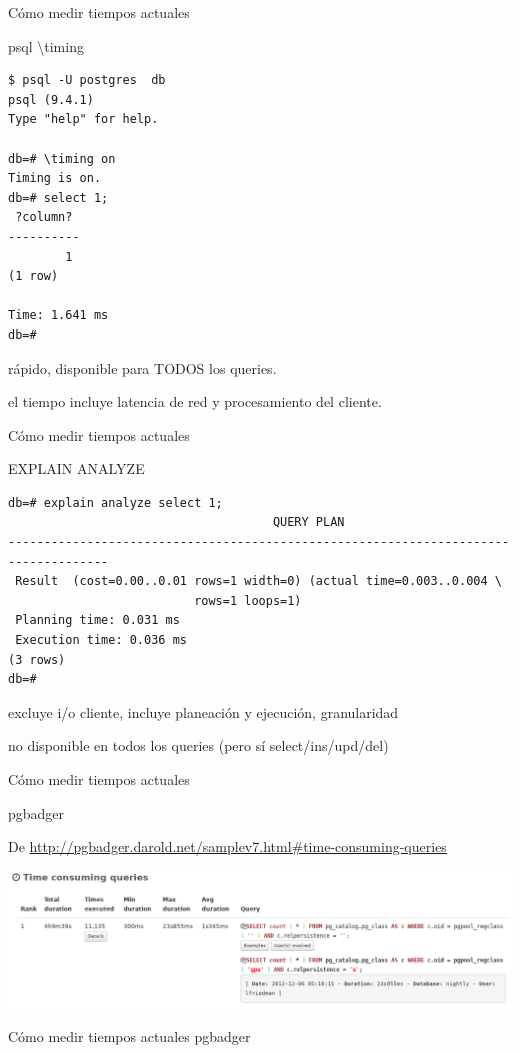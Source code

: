 \documentclass[11pt,spanish]{article}
\newcommand{\rowsp}[1][1em]{\vspace{#1}}
\newcommand{\hone}[1]{{\rowsp[0.3em]\noindent\Large #1 \rowsp[0.3em]}}
\newcommand{\htwo}[1]{{\rowsp\noindent\large #1 \rowsp}}
\newcommand{\mydesc}[1]{%
	\begin{description}
	\setlength\itemsep{0em}%
	#1
	\end{description}
}
\newcommand{\pros}{\item[pros:]}
\newcommand{\cons}{\item[cons:]}
\begin{document}
\newpage
\hone{Cómo medir tiempos actuales}

\htwo{psql \textbackslash timing}

\begin{multicols}{2}
\begin{lstlisting}
$ psql -U postgres  db      
psql (9.4.1)
Type "help" for help.

db=# \timing on
Timing is on.
db=# select 1;
 ?column? 
----------
        1
(1 row)

Time: 1.641 ms
db=# 
\end{lstlisting}

\columnbreak

\mydesc{
	\pros rápido, disponible para TODOS los queries.
	\cons el tiempo incluye latencia de red y procesamiento del cliente.
}
\end{multicols}

\newpage %
\hone{Cómo medir tiempos actuales}

\htwo{EXPLAIN ANALYZE}

\begin{lstlisting}
db=# explain analyze select 1;
                                     QUERY PLAN                                     
------------------------------------------------------------------------------------
 Result  (cost=0.00..0.01 rows=1 width=0) (actual time=0.003..0.004 \
					   	  rows=1 loops=1)
 Planning time: 0.031 ms
 Execution time: 0.036 ms
(3 rows)
db=# 
\end{lstlisting}

\mydesc{
	\pros excluye i/o cliente, incluye planeación y ejecución, granularidad
	\cons no disponible en todos los queries (pero sí select/ins/upd/del)
}

\newpage %
\hone{Cómo medir tiempos actuales}

\htwo{pgbadger}

De \url{http://pgbadger.darold.net/samplev7.html#time-consuming-queries}

\includegraphics[width=\textwidth]{img/pgbadger-tm1}

\newpage %
\hone{Cómo medir tiempos actuales}
\htwo{pgbadger}
\end{document}

